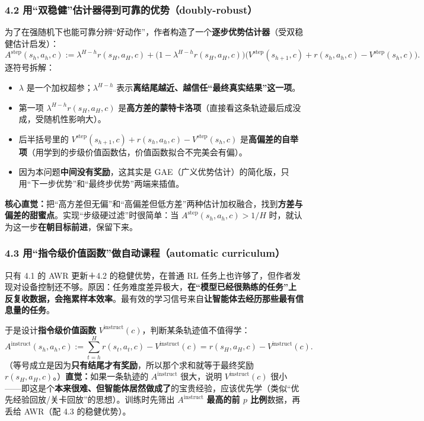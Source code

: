 \documentclass[11pt,UTF8,fontset=fandol]{ctexart}
\begin{document}
\subsubsection*{4.2 用“双稳健”估计器得到可靠的优势（doubly-robust）}
为了在强随机下也能可靠分辨“好动作”，作者构造了一个\textbf{逐步优势估计器}（受双稳健估计启发）：
\[
A^{\mathrm{step}}(s_h,a_h,c):=\lambda^{H-h} r(s_H,a_H,c)+\big(1-\lambda^{H-h} r(s_H,a_H,c)\big)\big(V^{\mathrm{step}}(s_{h+1},c)+r(s_h,a_h,c)-V^{\mathrm{step}}(s_h,c)\big). \tag{4.3}
\]
逐符号拆解：
\begin{itemize}[leftmargin=1.4em]
\item $\lambda$ 是一个加权超参；$\lambda^{H-h}$ 表示\textbf{离结尾越近、越信任“最终真实结果”这一项}。
\item 第一项 $\lambda^{H-h} r(s_H,a_H,c)$ 是\textbf{高方差的蒙特卡洛项}（直接看这条轨迹最后成没成，受随机性影响大）。
\item 后半括号里的 $V^{\mathrm{step}}(s_{h+1},c)+r(s_h,a_h,c)-V^{\mathrm{step}}(s_h,c)$ 是\textbf{高偏差的自举项}（用学到的步级价值函数估，价值函数拟合不完美会有偏）。
\item 因为本问题\textbf{中间没有奖励}，这其实是 GAE（广义优势估计）的简化版，只用“下一步优势”和“最终步优势”两端来插值。
\end{itemize}
\textbf{核心直觉：}把“高方差但无偏”和“高偏差但低方差”两种估计加权融合，找到\textbf{方差与偏差的甜蜜点}。实现“步级硬过滤”时很简单：当 $A^{\mathrm{step}}(s_h,a_h,c)>1/H$ 时，就认为这一步\textbf{在朝目标前进}，保留下来。

\subsubsection*{4.3 用“指令级价值函数”做自动课程（automatic curriculum）}
只有 4.1 的 AWR 更新＋4.2 的稳健优势，在普通 RL 任务上也许够了，但作者发现对设备控制还不够。原因：任务难度差异极大，\textbf{在“模型已经很熟练的任务”上反复收数据，会拖累样本效率}。最有效的学习信号来自\textbf{让智能体去经历那些最有信息量的任务}。

于是设计\textbf{指令级价值函数} $V^{\mathrm{instruct}}(c)$，判断某条轨迹值不值得学：
\[
A^{\mathrm{instruct}}(s_h,a_h,c):=\sum_{t=h}^{H} r(s_t,a_t,c)-V^{\mathrm{instruct}}(c)=r(s_H,a_H,c)-V^{\mathrm{instruct}}(c). \tag{4.4}
\]
（等号成立是因为\textbf{只有结尾才有奖励}，所以那个求和就等于最终奖励 $r(s_H,a_H,c)$。）\textbf{直觉：}如果一条轨迹的 $A^{\mathrm{instruct}}$ 很大，说明 $V^{\mathrm{instruct}}(c)$ 很小——即这是个\textbf{本来很难、但智能体居然做成了}的宝贵经验，应该优先学（类似“优先经验回放/关卡回放”的思想）。训练时先筛出 $A^{\mathrm{instruct}}$ \textbf{最高的前 $p$ 比例}数据，再丢给 AWR（配 4.3 的稳健优势）。
\end{document}
